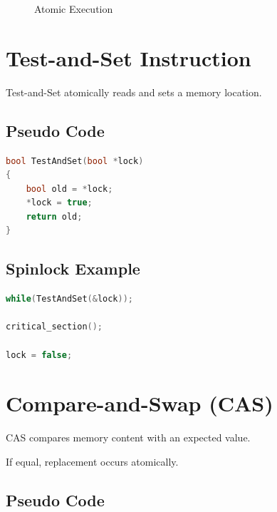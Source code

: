 \begin{figure}[H]
\centering
{}
\caption{Atomic Execution}
\end{figure}

\section{Test-and-Set Instruction}

Test-and-Set atomically reads and sets a memory location.

\subsection{Pseudo Code}

\begin{lstlisting}[language=C++,style=interviewcode]
bool TestAndSet(bool *lock)
{
    bool old = *lock;
    *lock = true;
    return old;
}
\end{lstlisting}

\subsection{Spinlock Example}

\begin{lstlisting}[language=C++,style=interviewcode]
while(TestAndSet(&lock));

critical_section();

lock = false;
\end{lstlisting}

\section{Compare-and-Swap (CAS)}

CAS compares memory content with an expected value.

If equal, replacement occurs atomically.

\subsection{Pseudo Code}

